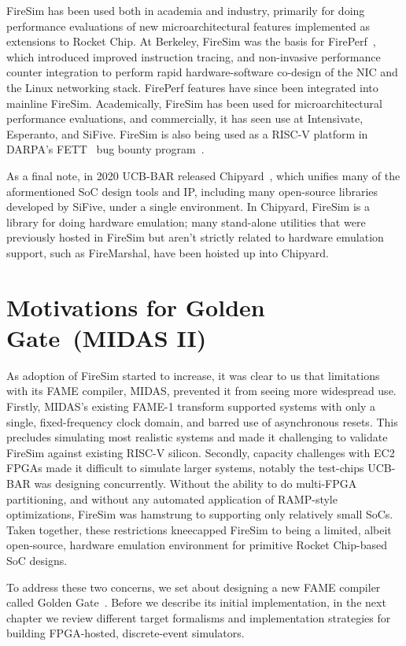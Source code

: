 FireSim has been used both in academia and industry, primarily for doing
performance evaluations of new microarchitectural features implemented as
extensions to Rocket Chip.  At Berkeley, FireSim was the basis for
FirePerf~\cite{FirePerf}, which introduced improved instruction tracing, and
non-invasive performance counter integration to perform rapid hardware-software co-design of the NIC
and the Linux networking stack. FirePerf features have since been integrated into
mainline FireSim. Academically, FireSim has been used for microarchitectural performance evaluations,
and commercially, it has seen use at Intensivate, Esperanto, and SiFive. FireSim is also being used as a RISC-V platform in DARPA's
FETT~\cite{FETT} bug bounty program~\cite{FireSimFETT}.

As a final note, in 2020 UCB-BAR released Chipyard~\cite{Chipyard}, which unifies many of the aformentioned SoC design tools and IP, including 
many open-source libraries developed by SiFive, under a single environment. In Chipyard,
FireSim is a library for doing hardware emulation; many stand-alone utilities
that were previously hosted in FireSim but aren't strictly related to hardware emulation
support, such as FireMarshal, have been hoisted up into Chipyard.

\section{Motivations for Golden Gate~(MIDAS II)}

As adoption of FireSim started to increase, it was clear to us that limitations with
its FAME compiler, MIDAS, prevented it from seeing more widespread use. Firstly, MIDAS's existing FAME-1
transform supported systems with only a single, fixed-frequency clock domain,
and barred use of asynchronous resets. This precludes
simulating most realistic systems and made it challenging to validate FireSim
against existing RISC-V silicon. Secondly, capacity challenges with EC2
FPGAs made it difficult to simulate larger systems, notably the test-chips
UCB-BAR was designing concurrently. Without the ability to do multi-FPGA
partitioning, and without any automated application of RAMP-style
optimizations, FireSim was hamstrung to supporting only relatively small
SoCs. Taken together, these restrictions kneecapped FireSim to being a limited, albeit
open-source, hardware emulation environment for primitive Rocket Chip-based SoC designs.

To address these two concerns, we set about designing a new FAME compiler
called Golden Gate~\cite{GoldenGate}. Before we describe its initial
implementation, in the next chapter we review different target formalisms and
implementation strategies for building FPGA-hosted, discrete-event simulators.
